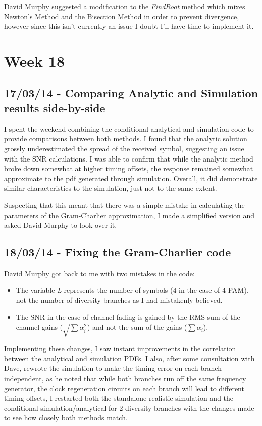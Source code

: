 David Murphy suggested a modification to the \emph{FindRoot} method which mixes
Newton's Method and the Bisection Method in order to prevent divergence,
however since this isn't currently an issue I doubt I'll have time to
implement it.

\section{Week 18}

\subsection{17/03/14 - Comparing Analytic and Simulation results
side-by-side}

I spent the weekend combining the conditional analytical and simulation
code to provide comparisons between both methods. I found that the
analytic solution grossly underestimated the spread of the received
symbol, suggesting an issue with the SNR calculations. I was able to
confirm that while the analytic method broke down somewhat at higher
timing offsets, the response remained somewhat approximate to the pdf
generated through simulation. Overall, it did demonstrate similar
characteristics to the simulation, just not to the same extent.

Suspecting that this meant that there was a simple mistake in
calculating the parameters of the Gram-Charlier approximation, I made a
simplified version and asked David Murphy to look over it.

\subsection{18/03/14 - Fixing the Gram-Charlier code}

David Murphy got back to me with two mistakes in the code:

\begin{itemize}
\itemsep1pt\parskip0pt
\item
  The variable \emph{L} represents the number of symbols (4 in the case
  of 4-PAM), not the number of diversity branches as I had mistakenly
  believed.
\item
  The SNR in the case of channel fading is gained by the RMS sum of the
  channel gains ($\sqrt{\sum \alpha_i^2}$) and not the sum of the gains
  ($\sum \alpha_i$).
\end{itemize}

Implementing these changes, I saw instant improvements in the
correlation between the analytical and simulation PDFs. I also, after
some consultation with Dave, rewrote the simulation to make the timing
error on each branch independent, as he noted that while both branches
run off the same frequency generator, the clock regeneration circuits on
each branch will lead to different timing offsets, I restarted both the
standalone realistic simulation and the conditional
simulation/analytical for 2 diversity branches with the changes made to
see how closely both methods match.

